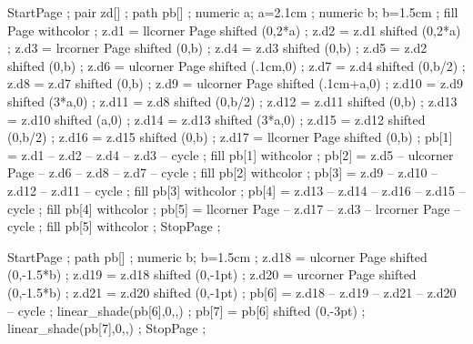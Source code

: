 


\definecolor [a]                [s=.97]
\definecolor [b] 	        [s=.88]
\definecolor [c]                [r=.75]
\definecolor [Item]             [r=.75]


StartPage ;
pair zd[] ;
path pb[] ;
numeric a; a=2.1cm ;
numeric b; b=1.5cm ;
fill Page withcolor  ;
z.d1 = llcorner Page shifted (0,2*a) ;
z.d2 = z.d1 shifted (0,2*a) ;
z.d3 = lrcorner Page shifted (0,b) ;
z.d4 = z.d3 shifted (0,b) ;
z.d5 = z.d2 shifted (0,b) ;
z.d6 = ulcorner Page  shifted (.1cm,0) ;
z.d7 = z.d4 shifted (0,b/2) ;
z.d8 = z.d7 shifted (0,b) ;
z.d9 = ulcorner Page shifted (.1cm+a,0) ;
z.d10 = z.d9 shifted (3*a,0) ;
z.d11 = z.d8 shifted (0,b/2) ;
z.d12 = z.d11 shifted (0,b) ;
z.d13 = z.d10 shifted (a,0) ;
z.d14 = z.d13 shifted (3*a,0) ;
z.d15 = z.d12 shifted (0,b/2) ;
z.d16 = z.d15 shifted (0,b) ;
z.d17 = llcorner Page shifted (0,b) ;
pb[1] = z.d1 -- z.d2 -- z.d4 -- z.d3 -- cycle ;
fill pb[1] withcolor  ;
pb[2] = z.d5 -- ulcorner Page -- z.d6 -- z.d8 -- z.d7 -- cycle ;
fill pb[2] withcolor  ;
pb[3] = z.d9 -- z.d10 -- z.d12 -- z.d11 -- cycle ;
fill pb[3] withcolor  ;
pb[4] = z.d13 -- z.d14 -- z.d16 -- z.d15 -- cycle ;
fill pb[4] withcolor  ;
pb[5] = llcorner Page -- z.d17 -- z.d3 -- lrcorner Page -- cycle ;
fill pb[5] withcolor  ;
StopPage ;
\stopuniqueMPgraphic 

StartPage ;
path pb[] ;
numeric b; b=1.5cm ;
z.d18 = ulcorner Page shifted (0,-1.5*b) ;
z.d19 = z.d18 shifted (0,-1pt) ;
z.d20 = urcorner Page shifted (0,-1.5*b) ;
z.d21 = z.d20 shifted (0,-1pt) ;
pb[6] = z.d18 -- z.d19 -- z.d21 -- z.d20 -- cycle ;
linear_shade(pb[6],0,,) ;
pb[7] = pb[6] shifted (0,-3pt) ;
linear_shade(pb[7],0,,) ;
StopPage ;
\stopuniqueMPgraphic

